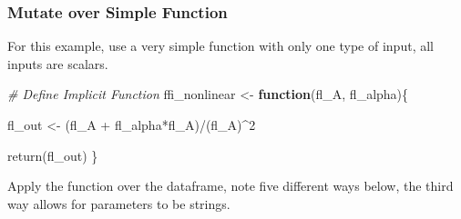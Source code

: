 \documentclass[
]{book}
\newenvironment{Shaded}{\begin{snugshade}}{\end{snugshade}}
\newcommand{\CommentTok}[1]{\textcolor[rgb]{0.56,0.35,0.01}{\textit{#1}}}
\newcommand{\ControlFlowTok}[1]{\textcolor[rgb]{0.13,0.29,0.53}{\textbf{#1}}}
\newcommand{\DecValTok}[1]{\textcolor[rgb]{0.00,0.00,0.81}{#1}}
\newcommand{\FunctionTok}[1]{\textcolor[rgb]{0.00,0.00,0.00}{#1}}
\newcommand{\NormalTok}[1]{#1}
\newcommand{\OtherTok}[1]{\textcolor[rgb]{0.56,0.35,0.01}{#1}}
\newcommand{\SpecialCharTok}[1]{\textcolor[rgb]{0.00,0.00,0.00}{#1}}
\begin{document}
\hypertarget{mutate-over-simple-function}{%
\subsubsection{Mutate over Simple Function}\label{mutate-over-simple-function}}

For this example, use a very simple function with only one type of input, all inputs are scalars.

\begin{Shaded}
\begin{Highlighting}[]
\CommentTok{\# Define Implicit Function}
\NormalTok{ffi\_nonlinear }\OtherTok{\textless{}{-}} \ControlFlowTok{function}\NormalTok{(fl\_A, fl\_alpha)\{}

\NormalTok{  fl\_out }\OtherTok{\textless{}{-}}\NormalTok{ (fl\_A }\SpecialCharTok{+}\NormalTok{ fl\_alpha}\SpecialCharTok{*}\NormalTok{fl\_A)}\SpecialCharTok{/}\NormalTok{(fl\_A)}\SpecialCharTok{\^{}}\DecValTok{2}

  \FunctionTok{return}\NormalTok{(fl\_out)}
\NormalTok{\}}
\end{Highlighting}
\end{Shaded}

Apply the function over the dataframe, note five different ways below, the third way allows for parameters to be strings.
\end{document}
